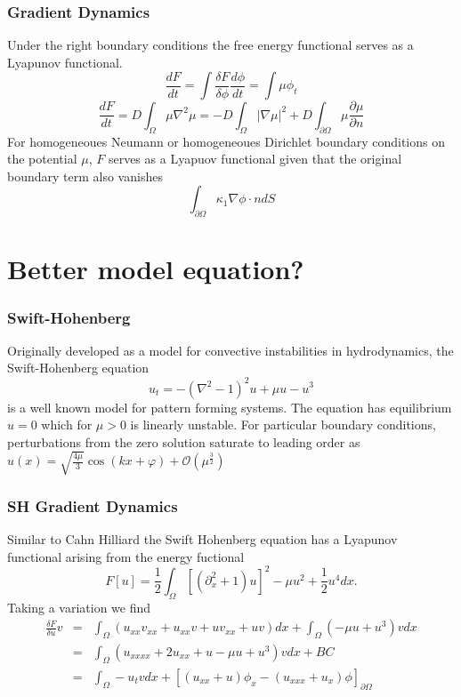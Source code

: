 \documentclass{beamer}
\begin{document}
\begin{frame}
 \frametitle{Gradient Dynamics}
 Under the right boundary conditions the free energy functional serves as a Lyapunov functional.
 \[
  \frac{dF}{dt} = \int \frac{\delta F}{\delta \phi}\frac{d\phi}{dt} = \int \mu \phi_t
 \]
 \[
  \frac{dF}{dt} = D \int_\Omega \mu \nabla^2\mu = -D\int_\Omega |\nabla\mu|^2 + D\int_{\partial\Omega} \mu \frac{\partial \mu}{\partial n}
 \]
 \pause
 For homogeneoues Neumann or homogeneoues Dirichlet boundary conditions on the potential $\mu$, $F$ serves as a Lyapuov functional given that the original boundary term also vanishes
 \[
   \int_{\partial \Omega} \kappa_1 \nabla\phi\cdot n dS
 \]


\end{frame}



\section{Better model equation?}

\begin{frame}
 \frametitle{Swift-Hohenberg}
Originally developed as a model for convective instabilities in hydrodynamics, the Swift-Hohenberg equation
\[
u_t=-(\nabla^2-1)^2u + \mu u -u^3
\]
is a well known model for pattern forming systems.  The equation has equilibrium $u=0$ which for $\mu>0$ is linearly unstable.  
For particular boundary conditions, perturbations from the zero solution saturate to leading order as $u(x)=\sqrt{\frac{4\mu}{3}}\cos(kx + \varphi) + \mathcal{O}(\mu^{\frac{3}{2}})$
\end{frame}

\begin{frame}
 \frametitle{SH Gradient Dynamics}
Similar to Cahn Hilliard the Swift Hohenberg equation has a Lyapunov functional arising from the energy fuctional
\[
 F[u] = \frac{1}{2} \int_\Omega {[(\partial_x^2 + 1)u]^2 - \mu u^2 + \frac{1}{2}u^4 }dx.
\]
\pause
Taking a variation we find
\begin{eqnarray*}
 \frac{\delta F}{\delta u}v &=& \int_\Omega (u_{xx}v_{xx} + u_{xx}v + uv_{xx} + uv)dx + \int_\Omega (-\mu u + u^3)vdx \\
 &=& \int_\Omega (u_{xxxx} + 2u_{xx} + u -\mu u + u^3)vdx + BC \\
 &=& \int_\Omega -u_t vdx + [(u_{xx} + u)\phi_x - (u_{xxx} + u_x)\phi]_{\partial\Omega}
\end{eqnarray*}
\end{frame}
\end{document}
